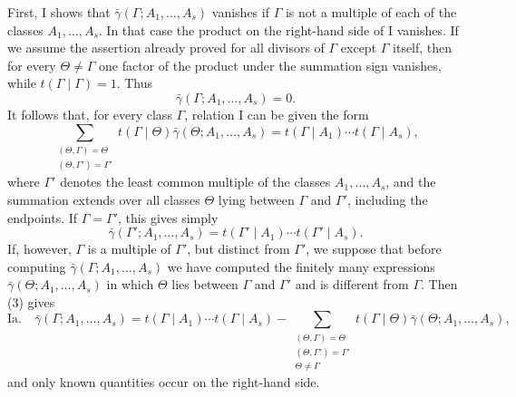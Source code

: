 \documentclass[11pt,a4paper]{article}
\begin{document}
First, I shows that $\bar\gamma(\Gamma;A_1,\ldots,A_s)$ vanishes if $\Gamma$ is not a multiple of each of the classes $A_1,\ldots,A_s$. In that case the product on the right-hand side of I vanishes. If we assume the assertion already proved for all divisors of $\Gamma$ except $\Gamma$ itself, then for every $\Theta\ne\Gamma$ one factor of the product under the summation sign vanishes, while $t(\Gamma\mid\Gamma)=1$. Thus
\[
 \bar\gamma(\Gamma;A_1,\ldots,A_s)=0.
\]
It follows that, for every class $\Gamma$, relation I can be given the form
\begin{equation}
 \sum_{\substack{(\Theta,\Gamma)=\Theta\\(\Theta,\Gamma')=\Gamma'}}
 t(\Gamma\mid\Theta)\bar\gamma(\Theta;A_1,\ldots,A_s)
 =t(\Gamma\mid A_1)\cdots t(\Gamma\mid A_s),
\tag{3}
\end{equation}
where $\Gamma'$ denotes the least common multiple of the classes $A_1,\ldots,A_s$, and the summation extends over all classes $\Theta$ lying between $\Gamma$ and $\Gamma'$, including the endpoints. If $\Gamma=\Gamma'$, this gives simply
\[
 \bar\gamma(\Gamma';A_1,\ldots,A_s)=t(\Gamma'\mid A_1)\cdots t(\Gamma'\mid A_s).
\]
If, however, $\Gamma$ is a multiple of $\Gamma'$, but distinct from $\Gamma'$, we suppose that before computing $\bar\gamma(\Gamma;A_1,\ldots,A_s)$ we have computed the finitely many expressions $\bar\gamma(\Theta;A_1,\ldots,A_s)$ in which $\Theta$ lies between $\Gamma$ and $\Gamma'$ and is different from $\Gamma$. Then (3) gives
\[
\text{Ia.}\quad
 \bar\gamma(\Gamma;A_1,\ldots,A_s)
 =t(\Gamma\mid A_1)\cdots t(\Gamma\mid A_s)
 -\sum_{\substack{(\Theta,\Gamma)=\Theta\\(\Theta,\Gamma')=\Gamma'\\\Theta\ne\Gamma}}
 t(\Gamma\mid\Theta)\bar\gamma(\Theta;A_1,\ldots,A_s),
\]
and only known quantities occur on the right-hand side.
\end{document}
